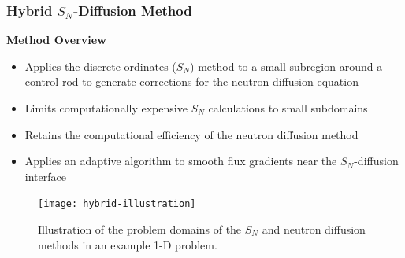 \begin{frame}
  \frametitle{Hybrid $S_N$-Diffusion Method}
  \begin{block}{\textbf{Method Overview}}
    \begin{itemize}
      \item Applies the discrete ordinates ($S_N$) method to a small subregion around a
        control rod to generate corrections for the neutron diffusion equation
      \item Limits computationally expensive $S_N$ calculations to small subdomains
      \item Retains the computational efficiency of the neutron diffusion method
      \item Applies an adaptive algorithm to smooth flux gradients near the $S_N$-diffusion interface
    \end{itemize}
  \end{block}
  \begin{figure}
    \centering
    \texttt{[image: hybrid-illustration]}
    \caption{Illustration of the problem domains of the $S_N$ and neutron diffusion methods in an
    example 1-D problem.}
  \end{figure}
\end{frame}

